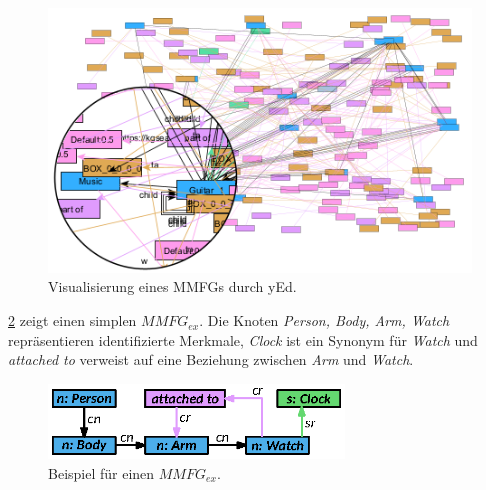\begin{figure}[htb]
    \centering
    \includegraphics{resources/images/mmfg-example.png}
    \caption{Visualisierung eines MMFGs durch yEd.}
    \label{sec2:sota:subsec:fz-explainability:fig:mmfg-real-example}
\end{figure}
\cref{sec2:sota:subsec:fz-explainablity:fig:mmfg-example} zeigt einen simplen $MMFG_{ex}$. 
Die Knoten \textit{Person, Body, Arm, Watch} repräsentieren identifizierte Merkmale, \textit{Clock} ist ein Synonym für \textit{Watch} und \textit{attached to} verweist auf eine Beziehung zwischen \textit{Arm} und \textit{Watch}.

\begin{figure}
    \centering
    \includegraphics[width=0.7\textwidth]{chapter/chapter_2/mmfg-ex.eps}
    \caption{Beispiel für einen $MMFG_{ex}$.}
    \label{sec2:sota:subsec:fz-explainablity:fig:mmfg-example}
\end{figure}

